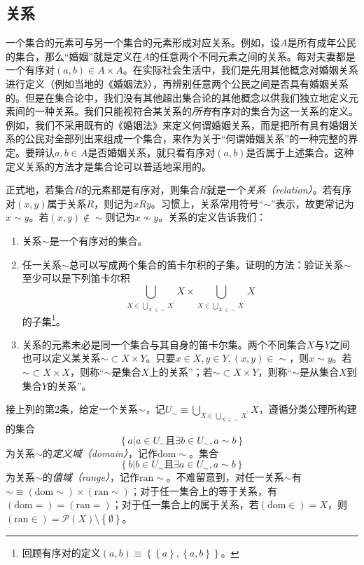 \documentclass[main.tex]{subfiles}
\begin{document}
\subsection{关系}
一个集合的元素可与另一个集合的元素形成对应关系。例如，设$A$是所有成年公民的集合，那么“婚姻”就是定义在$A$的任意两个不同元素之间的关系。每对夫妻都是一个有序对$\left(a,b\right)\in A\times A$。在实际社会生活中，我们是先用其他概念对婚姻关系进行定义（例如当地的《婚姻法》），再辨别任意两个公民之间是否具有婚姻关系的。但是在集合论中，我们没有其他超出集合论的其他概念以供我们独立地定义元素间的一种关系。我们只能视符合某关系的\emph{所有}有序对的集合为这一关系的定义。例如，我们不采用既有的《婚姻法》来定义何谓婚姻关系，而是把所有具有婚姻关系的公民对全部列出来组成一个集合，来作为关于“何谓婚姻关系”的一种完整的界定。要辩认$a, b\in A$是否婚姻关系，就只看有序对$\left(a,b\right)$是否属于上述集合。这种定义关系的方法才是集合论可以普适地采用的。

正式地，若集合$R$的元素都是有序对，则集合$R$就是一个\emph{关系（relation）}。若有序对$\left(x,y\right)$属于关系$R$，则记为$xRy$。习惯上，关系常用符号“$\sim$”表示，故更常记为$x\sim y$。若$\left(x,y\right)\notin\sim$则记为$x\not\sim y$。关系的定义告诉我们：

\begin{enumerate}
    \item 关系$\sim$是一个有序对的集合。
    \item 任一关系$\sim$总可以写成两个集合的笛卡尔积的子集。证明的方法：验证关系$\sim$至少可以是下列笛卡尔积
    \[
    \bigcup_{X\in\bigcup_{X^\prime\in\sim}X^\prime}X \times\bigcup_{X\in\bigcup_{X^\prime\in\sim}X^\prime}X
    \]
    的子集\footnote{回顾有序对的定义$\left(a,b\right)\equiv\left\{\left\{a\right\},\left\{a,b\right\}\right\}$。}。
    \item 关系的元素未必是同一个集合与其自身的笛卡尔集。两个不同集合$X$与$Y$之间也可以定义某关系$\sim\subset X\times Y$。只要$x\in X,y\in Y,\left(x,y\right)\in\sim$，则$x\sim y$。若$\sim\subset X\times X$，则称“$\sim$是集合$X$上的关系”；若$\sim\subset X\times Y$，则称“$\sim$是从集合$X$到集合$Y$的关系”。
\end{enumerate}

接上列的第2条，给定一个关系$\sim$，记$U_\sim\equiv\bigcup_{X\in\bigcup_{X^\prime\in\sim}X^\prime}X$，遵循分类公理所构建的集合
\[
\left\{a|a\in U_\sim\text{且}\exists b\in U_\sim, a\sim b\right\}
\]
为关系$\sim$的\emph{定义域（domain）}，记作$\mathrm{dom}\sim$。集合
\[
\left\{b|b\in U_\sim\text{且}\exists a\in U_\sim,a\sim b\right\}
\]
为关系$\sim$的\emph{值域（range）}，记作$\mathrm{ran}\sim$。不难留意到，对任一关系$\sim$有$\sim\equiv\left(\mathrm{dom}\sim\right)\times\left(\mathrm{ran}\sim\right)$；对于任一集合上的等于关系，有$\left(\mathrm{dom}=\right)=\left(\mathrm{ran}=\right)$；对于任一集合上的属于关系，若$\left(\mathrm{dom}\in\right)=X$，则$\left(\mathrm{ran}\in\right)=\mathcal{P}\left(X\right)\setminus\left\{\emptyset\right\}$。
\end{document}
